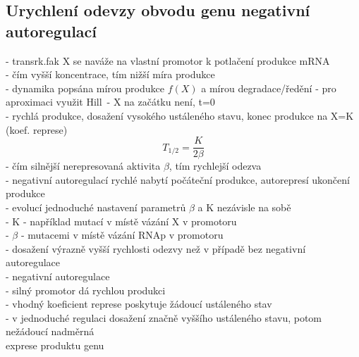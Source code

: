 \documentclass[11pt,a4paper]{report}
\begin{document}
\subsection{Urychlení odevzy obvodu genu negativní autoregulací}
- transrk.fak X se naváže na vlastní promotor k potlačení produkce mRNA\\
- čím vyšší koncentrace, tím nižší míra produkce\\
- dynamika popsána mírou produkce $f(X)$ a mírou degradace/ředění - pro aproximaci využit Hill\
- X na začátku není, t=0\\
\indent - rychlá produkce, dosažení vysokého ustáleného stavu, konec produkce na X=K (koef. represe)\\
\begin{equation}
T_{1/2}=\frac{K}{2\beta}
\end{equation}
\indent - čím silnější nerepresovaná aktivita $\beta$, tím rychlejší odezva\\
\indent - negativní autoregulací rychlé nabytí počáteční produkce, autorepresí ukončení produkce\\
\indent - evolucí jednoduché nastavení parametrů $\beta$ a K nezávisle na sobě\\
\indent \indent - K - například mutací v místě vázání X v promotoru\\
\indent \indent - $\beta$ - mutacemi v místě vázání RNAp v promotoru\\
\indent - dosažení výrazně vyšší rychlosti odezvy než v případě bez negativní autoregulace\\
- negativní autoregulace\\
\indent - silný promotor dá rychlou produkci\\
\indent - vhodný koeficient represe poskytuje žádoucí ustáleného stav\\
\indent - v jednoduché regulaci dosažení značně vyššího ustáleného stavu, potom nežádoucí nadměrná\\
\indent exprese produktu genu
\end{document}
